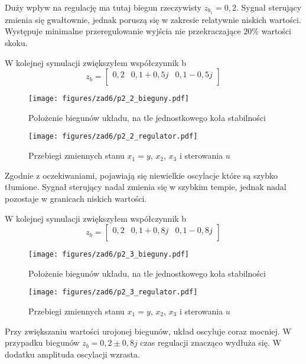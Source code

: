 \documentclass[a4paper,titlepage,11pt,floatssmall]{mwrep}
\begin{document}
Duży wpływ na regulację ma tutaj biegun rzeczywisty $z_{b_1} = 0,2$. Sygnał sterujący zmienia się gwałtownie, jednak poruszą się w zakresie relatywnie niskich wartości. Występuje minimalne przeregulowanie wyjścia nie przekraczające $20\%$ wartości skoku. 
\newpage

\indent W kolejnej symulacji zwiększyłem współczynnik b 
\[
z_b = 
\begin{bmatrix}
    0,2  &  0,1 + 0,5j  & 0,1 - 0,5j    \\     
\end{bmatrix}
\]

\begin{figure}[H]
\centering
\texttt{[image: figures/zad6/p2\_2\_bieguny.pdf]}
\caption{Położenie biegunów układu, na tle jednostkowego koła stabilności}
\end{figure} 

\begin{figure}[H]
\centering
\texttt{[image: figures/zad6/p2\_2\_regulator.pdf]}
\caption{Przebiegi zmiennych stanu $x_1 = y$, $x_2$, $x_3$ i sterowania $u$}
\end{figure}

Zgodnie z oczekiwaniami, pojawiają się niewielkie oscylacje które są szybko tłumione. Sygnał sterujący nadal zmienia się w szybkim tempie, jednak nadal pozostaje w granicach niskich wartości. 
\newpage

\indent W kolejnej symulacji zwiększyłem współczynnik b 
\[
z_b = 
\begin{bmatrix}
    0,2  &  0,1 + 0,8j  & 0,1 - 0,8j    \\     
\end{bmatrix}
\]

\begin{figure}[H]
\centering
\texttt{[image: figures/zad6/p2\_3\_bieguny.pdf]}
\caption{Położenie biegunów układu, na tle jednostkowego koła stabilności}
\end{figure} 

\begin{figure}[H]
\centering
\texttt{[image: figures/zad6/p2\_3\_regulator.pdf]}
\caption{Przebiegi zmiennych stanu $x_1 = y$, $x_2$, $x_3$ i sterowania $u$}
\end{figure}

Przy zwiększaniu wartości urojonej biegunów, układ oscyluje coraz mocniej. W przypadku biegunów $z_b = 0,2 \pm 0,8j$ czas regulacji znacząco wydłuża się. W dodatku amplituda oscylacji wzrasta. 
\newpage
\end{document}
